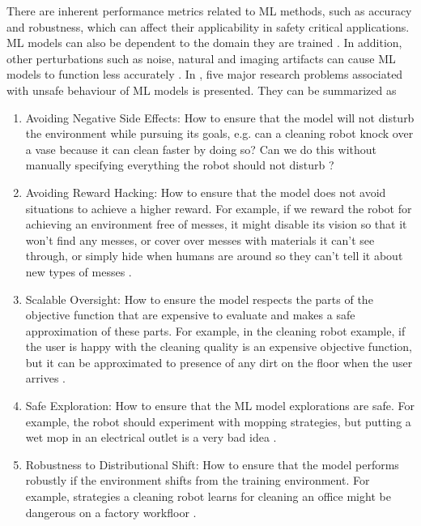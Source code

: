 
There are inherent performance metrics related to ML methods, such as accuracy and robustness, which can affect their applicability in safety critical applications. ML models can also be dependent to the domain they are trained \cite{Ganin2015}. In addition, other perturbations such as noise, natural and imaging artifacts can cause ML models to function less accurately \cite{Hendrycks2019}.
In \cite{Amodei}, five major research problems associated with unsafe behaviour of ML models is presented. They can be summarized as
\begin{enumerate}
	\item Avoiding Negative Side Effects: How to ensure that the model will not disturb the environment while pursuing its goals, e.g. can a cleaning robot knock over a vase because it can clean faster by doing so? Can we do this without manually specifying everything the robot should not disturb \cite{Amodei}?
	
	\item Avoiding Reward Hacking: How to ensure that the model does not avoid situations to achieve a higher reward. For example, if we reward the robot for achieving an environment free of messes, it might disable its vision so that it won’t find any messes, or cover over messes with materials it can’t see through, or simply hide when humans are around so they can’t tell it about new types of messes \cite{Amodei}. 
	
	\item Scalable Oversight: How to ensure the model respects the parts of the objective function that are expensive to evaluate and makes a safe approximation of these parts. 
	For example, in the cleaning robot example, if the user is happy with the cleaning quality is an expensive objective function, but it can be approximated to presence of any dirt on the floor when the user arrives \cite{Amodei}. 
	
	\item Safe Exploration: How to ensure that the ML model explorations are safe. For example, the robot should experiment with mopping strategies, but putting a wet mop in an electrical outlet is a very bad idea \cite{Amodei}. 
	
	\item Robustness to Distributional Shift: How to ensure that the model performs robustly if the environment shifts from the training environment. For example, strategies a cleaning robot learns for cleaning an office might be dangerous on a factory workfloor \cite{Amodei}.

\end{enumerate}

